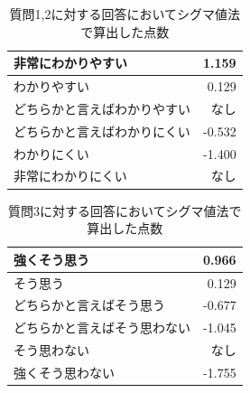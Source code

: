 \documentclass[shuuron]{kuee}
\begin{document}
\begin{table}
  \caption{質問1,2に対する回答においてシグマ値法で算出した点数}
  \label{table:sigma}
  \begin{center}
    \begin{tabular}{|l|r|} \hline
      非常にわかりやすい & 1.159 \\ \hline
      わかりやすい  & 0.129 \\ \hline
      どちらかと言えばわかりやすい & なし \\ \hline
      どちらかと言えばわかりにくい & -0.532 \\ \hline
      わかりにくい  & -1.400 \\ \hline
      非常にわかりにくい & なし \\ \hline
    \end{tabular}
  \end{center}
\end{table}

\begin{table}
  \caption{質問3に対する回答においてシグマ値法で算出した点数}
  \label{table:sigma2}
  \begin{center}
    \begin{tabular}{|l|r|} \hline
      強くそう思う & 0.966 \\ \hline
      そう思う  & 0.129 \\ \hline
      どちらかと言えばそう思う & -0.677 \\ \hline
      どちらかと言えばそう思わない & -1.045 \\ \hline
      そう思わない  & なし \\ \hline
      強くそう思わない & -1.755 \\ \hline
    \end{tabular}
  \end{center}
\end{table}
\end{document}
